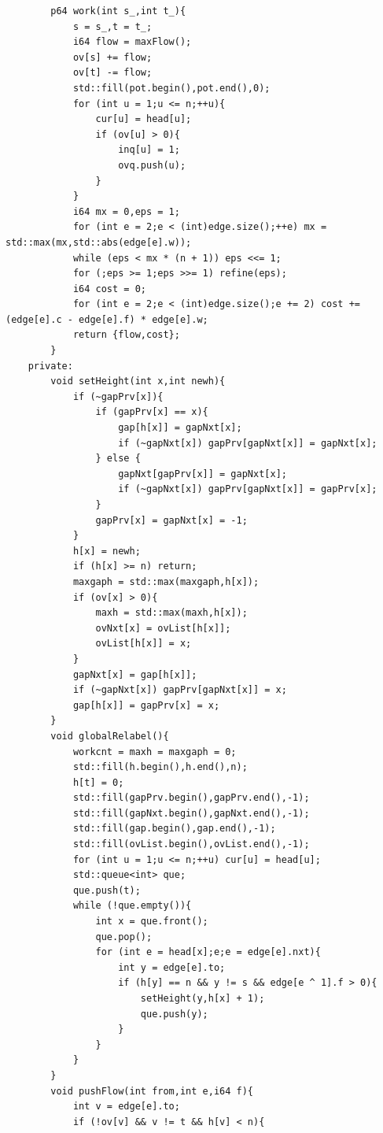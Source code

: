 \begin{lstlisting}
        p64 work(int s_,int t_){
            s = s_,t = t_;
            i64 flow = maxFlow();
            ov[s] += flow;
            ov[t] -= flow;
            std::fill(pot.begin(),pot.end(),0);
            for (int u = 1;u <= n;++u){
                cur[u] = head[u];
                if (ov[u] > 0){
                    inq[u] = 1;
                    ovq.push(u);
                }
            }
            i64 mx = 0,eps = 1;
            for (int e = 2;e < (int)edge.size();++e) mx = std::max(mx,std::abs(edge[e].w));
            while (eps < mx * (n + 1)) eps <<= 1;
            for (;eps >= 1;eps >>= 1) refine(eps);
            i64 cost = 0;
            for (int e = 2;e < (int)edge.size();e += 2) cost += (edge[e].c - edge[e].f) * edge[e].w;
            return {flow,cost};
        }
    private:
        void setHeight(int x,int newh){
            if (~gapPrv[x]){
                if (gapPrv[x] == x){
                    gap[h[x]] = gapNxt[x];
                    if (~gapNxt[x]) gapPrv[gapNxt[x]] = gapNxt[x];
                } else {
                    gapNxt[gapPrv[x]] = gapNxt[x];
                    if (~gapNxt[x]) gapPrv[gapNxt[x]] = gapPrv[x];
                }
                gapPrv[x] = gapNxt[x] = -1;
            }
            h[x] = newh;
            if (h[x] >= n) return;
            maxgaph = std::max(maxgaph,h[x]);
            if (ov[x] > 0){
                maxh = std::max(maxh,h[x]);
                ovNxt[x] = ovList[h[x]];
                ovList[h[x]] = x;
            }
            gapNxt[x] = gap[h[x]];
            if (~gapNxt[x]) gapPrv[gapNxt[x]] = x;
            gap[h[x]] = gapPrv[x] = x;
        }
        void globalRelabel(){
            workcnt = maxh = maxgaph = 0;
            std::fill(h.begin(),h.end(),n);
            h[t] = 0;
            std::fill(gapPrv.begin(),gapPrv.end(),-1);
            std::fill(gapNxt.begin(),gapNxt.end(),-1);
            std::fill(gap.begin(),gap.end(),-1);
            std::fill(ovList.begin(),ovList.end(),-1);
            for (int u = 1;u <= n;++u) cur[u] = head[u];
            std::queue<int> que;
            que.push(t);
            while (!que.empty()){
                int x = que.front();
                que.pop();
                for (int e = head[x];e;e = edge[e].nxt){
                    int y = edge[e].to;
                    if (h[y] == n && y != s && edge[e ^ 1].f > 0){
                        setHeight(y,h[x] + 1);
                        que.push(y);
                    }
                }
            }
        }
        void pushFlow(int from,int e,i64 f){
            int v = edge[e].to;
            if (!ov[v] && v != t && h[v] < n){

\end{lstlisting}
